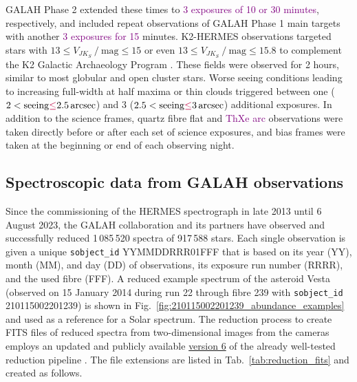 \documentclass[
  journal=pasa,
  manuscript=research-paper, %
  year=2024,
  volume=37
]{cup-journal}
\newcommand{\adjusted}[1]{{\textcolor{purple}{#1}}}
\newcommand{\allstarnumber}{917\,588\xspace}
\newcommand{\allspecnumber}{1\,085\,520\xspace}
\begin{document}
GALAH Phase 2 extended these times to \adjusted{3 exposures of 10 or 30 minutes}, respectively, and included repeat observations of GALAH Phase 1 main targets with another \adjusted{3 exposures for 15} minutes. K2-HERMES observations targeted stars with $13 \leq V_{JK_S}~/~\mathrm{mag} \leq 15$ or even $13 \leq V_{JK_S}~/~\mathrm{mag} \leq 15.8$ to complement the K2 Galactic Archaeology Program \citep{Stello2015}. These fields were observed for 2 hours, similar to most globular and open cluster stars. Worse seeing conditions leading to increasing full-width at half maxima or thin clouds triggered between one ($2 < \mathrm{seeing}\adjusted{ \leq }2.5\,\mathrm{arcsec}$) and 3 ($2.5 < \mathrm{seeing}\adjusted{ \leq }3\,\mathrm{arcsec}$) additional exposures. In addition to the science frames, quartz fibre flat and \adjusted{ThXe arc} observations were taken directly before or after each set of science exposures, and bias frames were taken at the beginning or end of each observing night.

\subsection{Spectroscopic data from GALAH observations}
\label{sec:spectroscopic_data_from_galah_observations}

Since the commissioning of the HERMES spectrograph in late 2013 until 6 August 2023, the GALAH collaboration and its partners have observed and successfully reduced \allspecnumber spectra of \allstarnumber stars. Each single observation is given a unique \texttt{sobject\_id} YYMMDDRRR01FFF that is based on its year (YY), month (MM), and day (DD) of observations, its exposure run number (RRRR), and the used fibre (FFF). A reduced example spectrum of the asteroid Vesta (observed on 15 January 2014 during run 22 through fibre 239 with \texttt{sobject\_id} 210115002201239) is shown in Fig.~\ref{fig:210115002201239_abundance_examples} and used as a reference for a Solar spectrum. The reduction process to create FITS files of reduced spectra from two-dimensional images from the cameras employs an updated and publicly available \href{https://github.com/sheliak/galah_reduction/blob/master/extract6.0.py}{version 6} of the already well-tested reduction pipeline \citep{Kos2017}. The file extensions are listed in Tab.~\ref{tab:reduction_fits} and created as follows.
\end{document}
